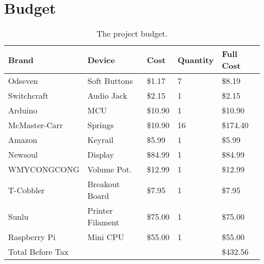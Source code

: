 \section{Budget}
\begin{table}[h!]
  \centering
  \begin{tabular}{|l|l|l|l|l|}
    \hline
    Brand            & Device                 & Cost    & Quantity & Full Cost \\ \hline
    Odseven          & Soft Buttons           & \$1.17  & 7        & \$8.19    \\ \hline
    Switchcraft      & Audio Jack             & \$2.15  & 1        & \$2.15    \\ \hline
    Arduino          & MCU                    & \$10.90 & 1        & \$10.90   \\ \hline
    McMaster-Carr    & Springs                & \$10.90 & 16       & \$174.40  \\ \hline
    Amazon           & Keyrail                & \$5.99  & 1        & \$5.99    \\ \hline
    Newsoul          & Display                & \$84.99 & 1        & \$84.99   \\ \hline
    WMYCONGCONG      & Volume Pot.            & \$12.99 & 1        & \$12.99   \\ \hline
    T-Cobbler        & Breakout Board         & \$7.95  & 1        & \$7.95    \\ \hline
    Sunlu            & Printer Filament       & \$75.00 & 1        & \$75.00   \\ \hline
    Raspberry Pi     & Mini CPU               & \$55.00 & 1        & \$55.00   \\ \hline
    Total Before Tax &                        &         &          & \$432.56  \\ \hline
  \end{tabular}
  \caption{The project budget.}
  \label{Tab:budget}
\end{table}

